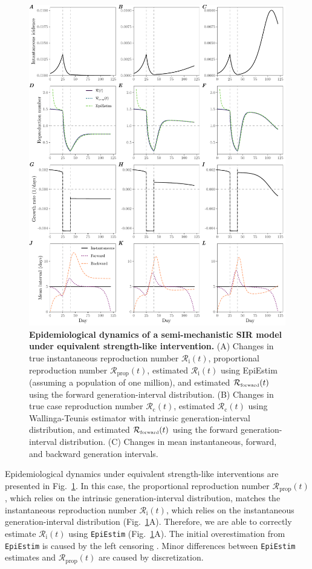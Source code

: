\documentclass[12pt]{article}
\newcommand{\fref}[1]{Fig.~\ref{fig:#1}}
\newcommand{\Rx}[1]{\ensuremath{{\mathcal R}_{#1}}\xspace}
\newcommand{\Rc}{\Rx{\mathrm{c}}}
\newcommand{\Ri}{\Rx{\mathrm{i}}}
\newcommand{\RR}{\ensuremath{{\mathcal R}}\xspace}
\newcommand{\Rprop}{\Rx{\mathrm{prop}}}
\newcommand{\tsub}[2]{#1_{{\textrm{\tiny #2}}}}
\begin{document}
\begin{figure}[!th]
\includegraphics[width=\textwidth]{figure_sir_beta.pdf}
\caption{
\textbf{Epidemiological dynamics of a semi-mechanistic SIR model under equivalent strength-like intervention.}
(A) Changes in true instantaneous reproduction number $\Ri(t)$, proportional reproduction number $\Rprop(t)$, estimated $\Ri(t)$ using EpiEstim (assuming a population of one million), and estimated $\tsub{\RR}{forward}(t)$ using the forward generation-interval distribution.
(B) Changes in true case reproduction number $\Rc(t)$, estimated $\Rc(t)$ using Wallinga-Teunis estimator with intrinsic generation-interval distribution, and estimated $\tsub{\RR}{forward}(t)$ using the forward generation-interval distribution.
(C) Changes in mean instantaneous, forward, and backward generation intervals.
}
\label{fig:sir_beta}
\end{figure}

Epidemiological dynamics under equivalent strength-like interventions are presented in \fref{sir_beta}.
In this case, the proportional reproduction number $\Rprop(t)$, which relies on the intrinsic generation-interval distribution, matches the instantaneous reproduction number $\Ri(t)$, which relies on the instantaneous generation-interval distribution (\fref{sir_beta}A).
Therefore, we are able to correctly estimate $\Ri(t)$ using \texttt{EpiEstim} (\fref{sir_beta}A).
The initial overestimation from \texttt{EpiEstim} is caused by the left censoring \citep{gostic2020practical}.
Minor differences between \texttt{EpiEstim} estimates and $\Rprop(t)$ are caused by discretization.
\end{document}
